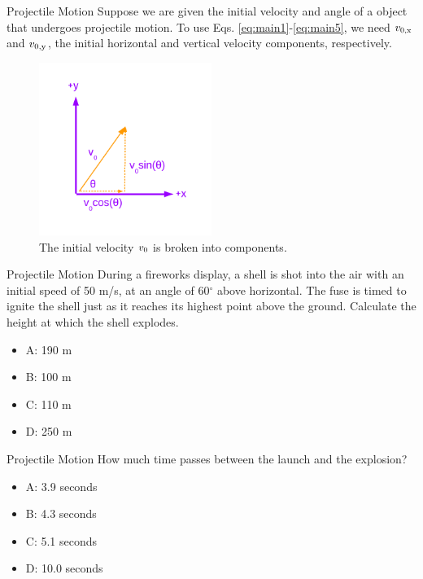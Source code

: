 \documentclass{beamer}
\begin{document}
\begin{frame}{Projectile Motion}
\small
Suppose we are given the initial velocity and angle of a object that undergoes projectile motion.  To use Eqs. \ref{eq:main1}-\ref{eq:main5}, we need $v_{\rm 0,x}$ and $v_{\rm 0,y}$, the initial horizontal and vertical velocity components, respectively.\\
\begin{figure}
\centering
\includegraphics[width=0.5\textwidth,trim=1cm 1cm 1cm 1cm,clip=true]{figures/Vectors1.pdf}
\caption{\label{fig:components} The initial velocity $v_{\rm 0}$ is broken into components.}
\end{figure}
\end{frame}

\begin{frame}{Projectile Motion}
\small
During a fireworks display, a shell is shot into the air with an initial speed of 50 m/s, at an angle of 60$^{\circ}$ above horizontal.  The fuse is timed to ignite the shell just as it reaches its highest point above the ground.  Calculate the height at which the shell explodes.
\begin{itemize}
\item A: 190 m
\item B: 100 m
\item C: 110 m
\item D: 250 m
\end{itemize}
\end{frame}

\begin{frame}{Projectile Motion}
\small
How much time passes between the launch and the explosion?
\begin{itemize}
\item A: 3.9 seconds
\item B: 4.3 seconds
\item C: 5.1 seconds
\item D: 10.0 seconds
\end{itemize}
\end{frame}
\end{document}
